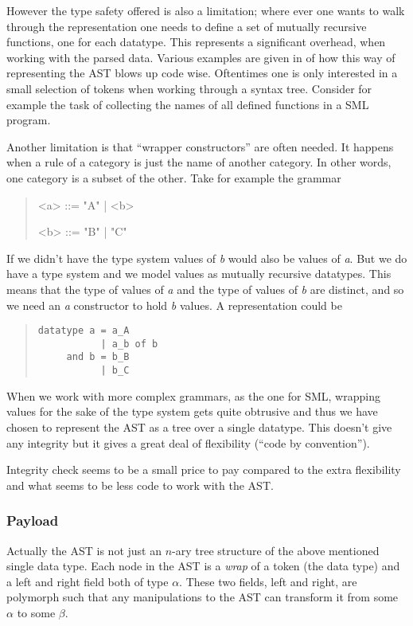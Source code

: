 However the type safety offered is also a limitation; where ever one wants to
walk through the representation one needs to define a set of mutually recursive
functions, one for each datatype. This represents a significant overhead, when
working with the parsed data. Various examples are given in \cite{mbp08} of how
this way of representing the AST blows up code wise. Oftentimes one is only
interested in a small selection of tokens when working through a syntax
tree. Consider for example the task of collecting the names of all defined
functions in a SML program.


Another limitation is that ``wrapper constructors'' are often needed. It happens
when a rule of a category is just the name of another category. In other words,
one category is a subset of the other. Take for example the grammar

\setlength{\grammarindent}{3.5em} 
\begin{quote}
  \begin{grammar}
    <a> ::= "A" | <b>

    <b> ::= "B" | "C"
  \end{grammar}
\end{quote}


If we didn't have the type system values of \textit{b} would also be values of
\textit{a}. But we do have a type system and we model values as mutually
recursive datatypes. This means that the type of values of \textit{a} and the
type of values of \textit{b} are distinct, and so we need an \textit{a}
constructor to hold \textit{b} values. A representation could be

\begin{quote}
\begin{verbatim}
datatype a = a_A
           | a_b of b
     and b = b_B
           | b_C
\end{verbatim}
\end{quote}

When we work with more complex grammars, as the one for SML, wrapping values for
the sake of the type system gets quite obtrusive and thus we have chosen to
represent the AST as a tree over a single datatype. This doesn't give any
integrity but it gives a great deal of flexibility (``code by
convention'').

Integrity check seems to be a small price to pay compared to the extra
flexibility and what seems to be less code to work with the AST.

\subsubsection{Payload}
Actually the AST is not just an $n$-ary tree structure of the above mentioned
single data type. Each node in the AST is a \textit{wrap} of a token (the data
type) and a left and right field both of type $\alpha$. These two fields, left
and right, are polymorph such that any manipulations to the AST can transform it
from some $\alpha$ to some $\beta$.


